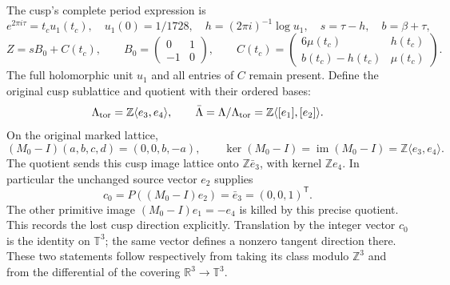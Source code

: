 The cusp's complete period expression is
\[
 e^{2\pi i\tau}=t_cu_1(t_c),\quad u_1(0)=1/1728,\quad
 h=(2\pi i)^{-1}\log u_1,\quad s=\tau-h,\quad b=\beta+\tau,
\]
\begin{equation}
 Z=sB_0+C(t_c),\qquad B_0=\begin{pmatrix}0&1\\-1&0\end{pmatrix},\qquad
 C(t_c)=\begin{pmatrix}6\mu(t_c)&h(t_c)\\b(t_c)-h(t_c)&\mu(t_c)\end{pmatrix}.
 \label{s6q:cusp-periods}
\end{equation}
The full holomorphic unit $u_1$ and all entries of $C$ remain present.
Define the original cusp sublattice and quotient with their ordered bases:
\[
 \Lambda_{\rm tor}=\mathbb Z\langle e_3,e_4\rangle,\qquad
 \bar\Lambda=\Lambda/\Lambda_{\rm tor}
   =\mathbb Z\langle[e_1],[e_2]\rangle.
\]
On the original marked lattice,
\[
 (M_0-I)(a,b,c,d)=(0,0,b,-a),\qquad
 \ker(M_0-I)=\operatorname{im}(M_0-I)
   =\mathbb Z\langle e_3,e_4\rangle.
\]
The quotient sends this cusp image lattice onto $\mathbb Z\bar e_3$,
with kernel $\mathbb Ze_4$. In particular the unchanged source vector
$e_2$ supplies
\begin{equation}
 c_0=P((M_0-I)e_2)=\bar e_3=(0,0,1)^{\mathsf T}.
 \label{s6q:cusp-direction}
\end{equation}
The other primitive image $(M_0-I)e_1=-e_4$ is killed by this precise
quotient. This records the lost cusp direction explicitly. Translation
by the integer vector $c_0$ is the identity on $\mathbb T^3$; the same
vector defines a nonzero tangent direction there. These two statements
follow respectively from taking its class modulo $\mathbb Z^3$ and from
the differential of the covering $\mathbb R^3\to\mathbb T^3$.

